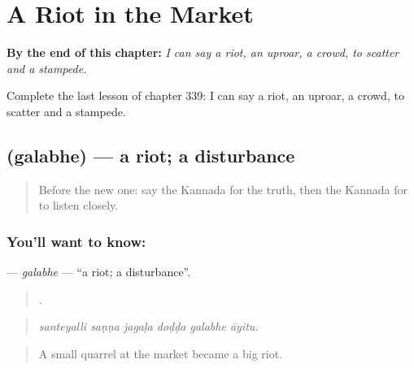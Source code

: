 
\chapter{A Riot in the Market}
\label{ch:ka-a-riot-in-the-market}

\begin{chapteropening}
\textbf{By the end of this chapter:} \emph{I can say a riot, an uproar, a crowd, to scatter and a stampede.}

Complete the last lesson of chapter 339: I can say a riot, an uproar, a crowd, to scatter and a stampede.
\end{chapteropening}

\section[\texorpdfstring{\kn{ಗಲಭೆ} (galabhe)}{ಗಲಭೆ (galabhe)}]{ (galabhe) — a riot; a disturbance}

\label{lesson:KA-C339-galabhe}



\begin{quote}
Before the new one: say the Kannada for the truth, then the Kannada for to listen closely.
\end{quote}

\subsection*{You'll want to know: }
\textbf{} — \emph{galabhe} — \textquotedblleft{}a riot; a disturbance\textquotedblright{}.

\begin{quote}
     .
\end{quote}

\begin{quote}
\emph{santeyalli saṇṇa jagaḷa doḍḍa galabhe āyitu.}
\end{quote}

\begin{quote}
A small quarrel at the market became a big riot.
\end{quote}

